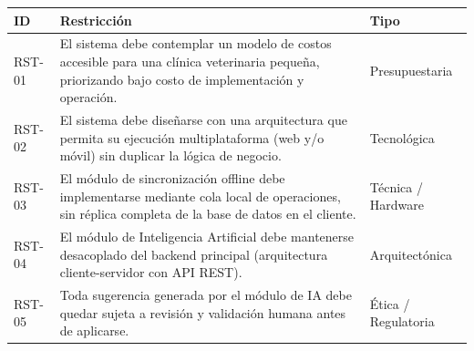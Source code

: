 \documentclass[
]{article}
\newcounter{none} %
\begin{document}
{\def\LTcaptype{none} %
\begin{longtable}[]{@{}
  >{\raggedright\arraybackslash}p{}
  >{\raggedright\arraybackslash}p{}
  >{\raggedright\arraybackslash}p{}@{}}
\toprule\noalign{}
\begin{minipage}[b]{\linewidth}\centering
\textbf{ID}
\end{minipage} & \begin{minipage}[b]{\linewidth}\centering
\textbf{Restricción}
\end{minipage} & \begin{minipage}[b]{\linewidth}\centering
\textbf{Tipo}
\end{minipage} \\
\midrule\noalign{}
\endhead
\bottomrule\noalign{}
\endlastfoot
RST-01 & El sistema debe contemplar un modelo de costos accesible para
una clínica veterinaria pequeña, priorizando bajo costo de
implementación y operación. & \begin{minipage}[t]{\linewidth}\raggedright
Presupuestaria
\end{minipage} \\
RST-02 & El sistema debe diseñarse con una arquitectura que permita
su ejecución multiplataforma (web y/o móvil) sin duplicar la lógica
de negocio. & \begin{minipage}[t]{\linewidth}\raggedright
Tecnológica
\end{minipage} \\
RST-03 & El módulo de sincronización offline debe implementarse
mediante cola local de operaciones, sin réplica completa de la base
de datos en el cliente. & \begin{minipage}[t]{\linewidth}\raggedright
Técnica / Hardware
\end{minipage} \\
RST-04 & El módulo de Inteligencia Artificial debe mantenerse
desacoplado del backend principal (arquitectura cliente-servidor con
API REST). & \begin{minipage}[t]{\linewidth}\raggedright
Arquitectónica
\end{minipage} \\
RST-05 & Toda sugerencia generada por el módulo de IA debe quedar
sujeta a revisión y validación humana antes de aplicarse. &
\begin{minipage}[t]{\linewidth}\raggedright
Ética / Regulatoria
\end{minipage} \\

\end{longtable}}
\end{document}
